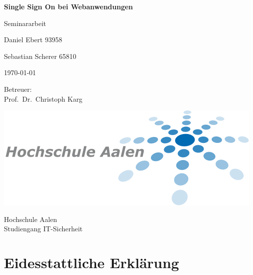 \documentclass[12pt]{report}
\newcommand{\addchapter}[1]{
  \begin{refsection}[#1]
    \clearpage
    
    \printbibliography[heading=chapterbib]  
  \end{refsection}
}
\begin{document}
\begin{center}
	\vspace*{40mm}%
	\textbf{\LARGE Single Sign On bei Webanwendungen}
	
	\vspace*{5mm}%
	{\large Seminararbeit}
	
	\vspace*{20mm}%
	{\Large Daniel Ebert 93958}
	
	\vspace{5mm}%
	{\Large Sebastian Scherer 65810}
	
	\vspace{35mm}%
	{\large \today}%
	
	\vspace{10mm}%
	{\large Betreuer:} \\[2mm]%
	{\small Prof.~Dr.~Christoph Karg}
	
	\vfill%
	\includegraphics[scale=0.35]{Images/hs-aalen-logo.png}
	
	\vspace{3mm}%
	Hochschule Aalen  \\%
	Studiengang IT-Sicherheit
\end{center}



\tableofcontents


\addchapter{ausarbeitung}

\pagestyle{empty}
\chapter*{Eidesstattliche Erkl\"arung}
\end{document}
